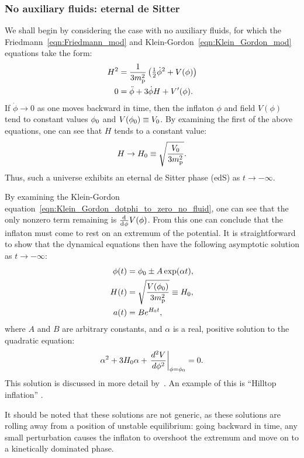 \subsubsection{No auxiliary fluids: eternal de Sitter}
We shall begin by considering the case with no auxiliary fluids, for which the Friedmann~\eqref{eqn:Friedmann_mod} and Klein-Gordon~\eqref{eqn:Klein_Gordon_mod} equations take the form:
%
\begin{align}
  H^2 
  &=
  \frac{1}{3m_{\mathrm{p}}^2}\left({\textstyle\frac{1}{2}}\dot{\phi}^2 + V(\phi) \right)
  \label{eqn:Friedmann_dotphi_to_zero_no_fluid} 
  \\
  0
  &=
  \ddot{\phi} +3\dot{\phi}H + V^\prime(\phi).
  \label{eqn:Klein_Gordon_dotphi_to_zero_no_fluid}
\end{align}
%
If \(\dot{\phi}\to 0\) as one moves backward in time, then the inflaton \(\phi\) and field \(V(\phi)\) tend to constant values \(\phi_0\) and \(V(\phi_0)\equiv V_0\). By examining the first of the above equations, one can see that \(H\) tends to a constant value:
%
\begin{equation}
  H\to H_0 \equiv \sqrt{\frac{V_0}{3m_{\mathrm{p}}^2}}.
\end{equation}
%
Thus, such a universe exhibits an eternal de Sitter phase (edS) as \(t\to-\infty\).

By examining the Klein-Gordon equation~\eqref{eqn:Klein_Gordon_dotphi_to_zero_no_fluid}, one can see that the only nonzero term remaining is \(\frac{\operatorname{d}^{}\!{}}{\operatorname{d}^{}\!{\phi}}V(\phi)\). From this one can conclude that the inflaton must come to rest on an extremum of the potential. It is straightforward to show that the dynamical equations then have the following asymptotic solution as \(t \to -\infty\):
%
\begin{align}
  \phi(t)
  &=
  \phi_0 \pm A \exp(\alpha t),\\
  H(t)
  &=
  \sqrt{\frac{V(\phi_0)}{3m_{\mathrm{p}}^2}} \equiv H_0,\\
  a(t)
  &=
  B e^{H_0t},
\end{align}
%
where \(A\) and \(B\)  are arbitrary constants, and \(\alpha\) is a real, positive solution to the quadratic equation:
% 
%
\begin{equation}
  \alpha^2 + 3H_0\alpha + \left.
  \frac{{d^2}V}{{d}\phi^2}\right|_{\phi=\phi_0}=0.
\end{equation}
%
This solution is discussed in more detail by~\cite{destri_preinflationary_2010}. An example of this is ``Hilltop inflation'' \citep{linde_1982,albrecht_1982}. 

It should be noted that these solutions are not generic, as these solutions are rolling away from a position of unstable equilibrium: going backward in time, any small perturbation causes the inflaton to overshoot the extremum and move on to a kinetically dominated phase.

